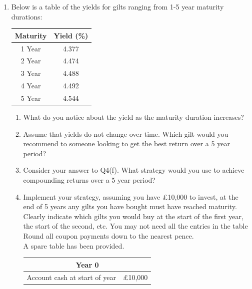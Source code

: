 \documentclass[12pt]{article}
\begin{document}
\begin{enumerate}[label=\textbf{Q\arabic*.}, start=4]
\newpage{}

\item Below is a table of the yields for gilts ranging from 1-5 year maturity durations:

\begin{center}
\begin{tabular}{|c|c|}
\hline
\textbf{Maturity} & \textbf{Yield (\%)} \\
\hline
1 Year  & 4.377 \\
2 Year  & 4.474 \\
3 Year  & 4.488 \\
4 Year  & 4.492 \\
5 Year  & 4.544 \\
\hline
\end{tabular}
\end{center}

\begin{enumerate}[label=(\alph*)]
    \item What do you notice about the yield as the maturity duration increases?
    \item Assume that yields do not change over time. Which gilt would you recommend to someone looking to get the best return over a 5 year period?
    \item Consider your answer to Q4(f). What strategy would you use to achieve compounding returns over a 5 year period?
    \item Implement your strategy, assuming you have £10,000 to invest, at the end of 5 years any gilts you have bought must have reached maturity.
    \\
    Clearly indicate which gilts you would buy at the start of the first year, the start of the second, etc. You may not need all the entries in the table \\
    Round all coupon payments down to the nearest pence. \\
    A spare table has been provided.

\vspace{-10cm}
{\small
\begin{flushleft}
\hspace*{-4cm}
\begin{tabular}{|p{4cm}|p{14cm}|}
\hline
\multicolumn{2}{|c|}{\textbf{Year 0}} \\
\hline
Account cash at start of year& £10{,}000 \\


\end{tabular}
\end{flushleft}}
\end{enumerate}
\end{enumerate}
\end{document}
